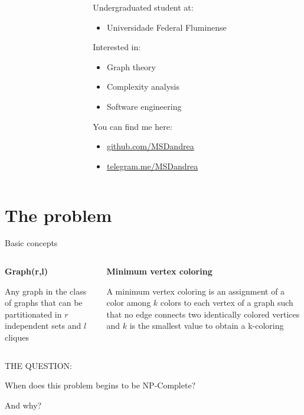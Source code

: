 \documentclass[9pt, compress]{beamer}
\begin{document}
\begin{frame}
\begin{columns}
\begin{column}{0.3\textwidth}
          \end{column}
          \begin{column}{0.5\textwidth}
            Undergraduated student at:
            \begin{itemize}
              \item Universidade Federal Fluminense
            \end{itemize}
            
            Interested in:
            \begin{itemize}
              \item Graph theory
              \item Complexity analysis
              \item Software engineering
            \end{itemize}
            
            You can find me here:
            \begin{itemize}
              \item \url{github.com/MSDandrea}
              \item \url{telegram.me/MSDandrea}
            \end{itemize}
          \end{column}
        \end{columns}
    \end{frame}
    \section{The problem}
    \begin{frame}{Basic concepts}
      \begin{columns}
        \begin{column}{0.5\textwidth}
          \textbf{Graph(r,l)}
          
          Any graph in the class of graphs that can be partitionated in $r$ independent sets and $l$ cliques
        \end{column}
        \begin{column}{0.5\textwidth}
          \textbf{Minimum vertex coloring}
          
          A minimum vertex coloring is an assignment of a color among $k$ colors to each vertex of a graph such that no edge connects two identically colored vertices and $k$ is the smallest value to obtain a k-coloring
        \end{column}
      \end{columns}
    \end{frame}
    \begin{frame}[standout]
      THE QUESTION:
      
      When does this problem begins to be NP-Complete? 
      
      And why?
    \end{frame}
\end{document}
